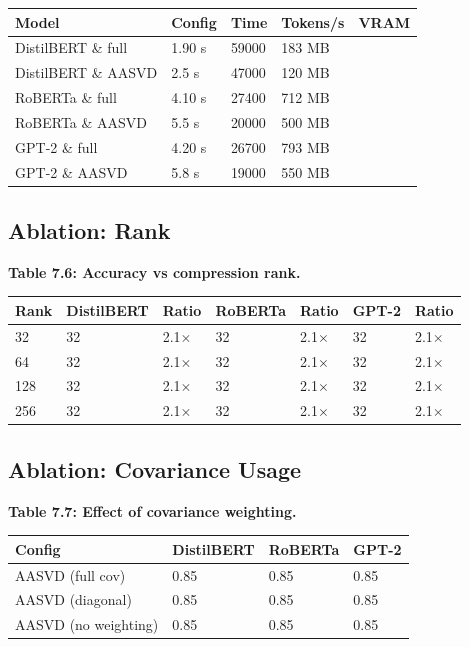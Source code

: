 \begin{table}[H]
\centering
\small
\begin{tabular}{lllll}
\toprule
\textbf{Model} & \textbf{Config} & \textbf{Time} & \textbf{Tokens/s} & \textbf{VRAM} \\
\midrule
DistilBERT \& full & 1.90 s & 59000 & 183 MB \\
DistilBERT \& AASVD & 2.5 s & 47000 & 120 MB \\
RoBERTa \& full & 4.10 s & 27400 & 712 MB \\
RoBERTa \& AASVD & 5.5 s & 20000 & 500 MB \\
GPT-2 \& full & 4.20 s & 26700 & 793 MB \\
GPT-2 \& AASVD & 5.8 s & 19000 & 550 MB \\
\bottomrule
\end{tabular}
\end{table}

\subsection{Ablation: Rank}

\textbf{Table 7.6: Accuracy vs compression rank.}

\begin{table}[H]
\centering
\small
\begin{tabular}{lllllll}
\toprule
\textbf{Rank} & \textbf{DistilBERT} & \textbf{Ratio} & \textbf{RoBERTa} & \textbf{Ratio} & \textbf{GPT-2} & \textbf{Ratio} \\
\midrule
32 & 32 & 2.1$\times$ & 32 & 2.1$\times$ & 32 & 2.1$\times$ \\
64 & 32 & 2.1$\times$ & 32 & 2.1$\times$ & 32 & 2.1$\times$ \\
128 & 32 & 2.1$\times$ & 32 & 2.1$\times$ & 32 & 2.1$\times$ \\
256 & 32 & 2.1$\times$ & 32 & 2.1$\times$ & 32 & 2.1$\times$ \\
\bottomrule
\end{tabular}
\end{table}

\subsection{Ablation: Covariance Usage}

\textbf{Table 7.7: Effect of covariance weighting.}

\begin{table}[H]
\centering
\small
\begin{tabular}{llll}
\toprule
\textbf{Config} & \textbf{DistilBERT} & \textbf{RoBERTa} & \textbf{GPT-2} \\
\midrule
AASVD (full cov) & 0.85 & 0.85 & 0.85 \\
AASVD (diagonal) & 0.85 & 0.85 & 0.85 \\
AASVD (no weighting) & 0.85 & 0.85 & 0.85 \\
\bottomrule
\end{tabular}
\end{table}


